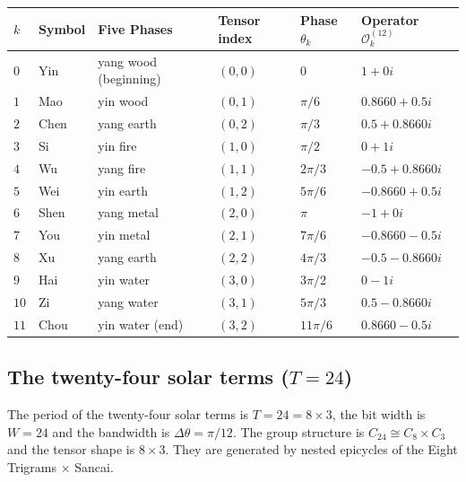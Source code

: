 \begin{center}
\begin{tabular}{>{\centering\arraybackslash}p{0.8cm}>{\centering\arraybackslash}p{1.6cm}>{\centering\arraybackslash}p{2.5cm}>{\centering\arraybackslash}p{1.8cm}>{\centering\arraybackslash}p{2cm}>{\centering\arraybackslash}p{3.3cm}}
\toprule
$k$ & Symbol & Five Phases & Tensor index & Phase $\theta_k$ & Operator $\mathcal{O}_k^{(12)}$ \\
\midrule
$0$ & Yin & yang wood (beginning) & $(0,0)$ & $0$ & $1+0i$ \\
$1$ & Mao & yin wood & $(0,1)$ & $\pi/6$ & $0.8660+0.5i$ \\
$2$ & Chen & yang earth & $(0,2)$ & $\pi/3$ & $0.5+0.8660i$ \\
$3$ & Si & yin fire & $(1,0)$ & $\pi/2$ & $0+1i$ \\
$4$ & Wu & yang fire & $(1,1)$ & $2\pi/3$ & $-0.5+0.8660i$ \\
$5$ & Wei & yin earth & $(1,2)$ & $5\pi/6$ & $-0.8660+0.5i$ \\
$6$ & Shen & yang metal & $(2,0)$ & $\pi$ & $-1+0i$ \\
$7$ & You & yin metal & $(2,1)$ & $7\pi/6$ & $-0.8660-0.5i$ \\
$8$ & Xu & yang earth & $(2,2)$ & $4\pi/3$ & $-0.5-0.8660i$ \\
$9$ & Hai & yin water & $(3,0)$ & $3\pi/2$ & $0-1i$ \\
$10$ & Zi & yang water & $(3,1)$ & $5\pi/3$ & $0.5-0.8660i$ \\
$11$ & Chou & yin water (end) & $(3,2)$ & $11\pi/6$ & $0.8660-0.5i$ \\
\bottomrule
\end{tabular}
\end{center}

\subsection{\texorpdfstring{The twenty-four solar terms ($T=24$)}{The twenty-four solar terms (T=24)}}

\begin{definition}\label{def:jieqi_operators}
The period of the twenty-four solar terms is $T=24=8 \times 3$, the bit width is $W=24$ and the bandwidth is $\Delta\theta=\pi/12$. The group structure is $C_{24} \cong C_8 \times C_3$ and the tensor shape is $8 \times 3$. They are generated by nested epicycles of the Eight Trigrams $\times$ Sancai.
\end{definition}

